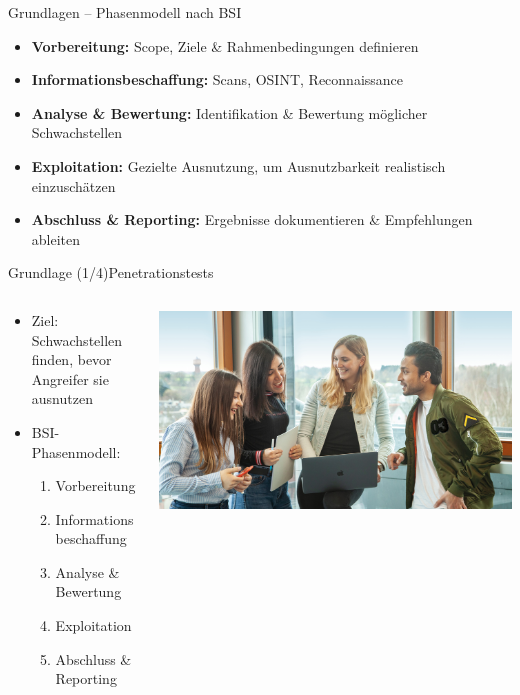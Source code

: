 \documentclass[
	aspectratio=169,	%
	onlytextwidth,		%
	t,					%
	]{beamer}
\begin{document}
\begin{frame}{Grundlagen – Phasenmodell nach BSI}
	\begin{itemize}
		\item \textbf{Vorbereitung:} Scope, Ziele \& Rahmenbedingungen definieren
		\item \textbf{Informationsbeschaffung:} Scans, OSINT, Reconnaissance
		\item \textbf{Analyse \& Bewertung:} Identifikation \& Bewertung möglicher Schwachstellen
		\item \textbf{Exploitation:} Gezielte Ausnutzung, um Ausnutzbarkeit realistisch einzuschätzen
		\item \textbf{Abschluss \& Reporting:} Ergebnisse dokumentieren \& Empfehlungen ableiten
	\end{itemize}
\end{frame}

\begin{frame}{Grundlage (1/4)}{Penetrationstests}
	\begin{columns}
			\begin{column}[T]{.55\textwidth}
				\begin{itemize}
					\item Ziel: Schwachstellen finden, bevor Angreifer sie ausnutzen
					\item BSI-Phasenmodell:
					\begin{enumerate}
						\item Vorbereitung
						\item Informationsbeschaffung
						\item Analyse \& Bewertung
						\item Exploitation
						\item Abschluss \& Reporting
					\end{enumerate}
				\end{itemize}
		
		\end{column}
		\begin{column}[T]{.5\textwidth}
			\centering
			\includegraphics[width=\textwidth]{figures/thankyou.jpg}
			\label{fig:thankyou}
		\end{column}
	\end{columns}
\end{frame}
\end{document}
